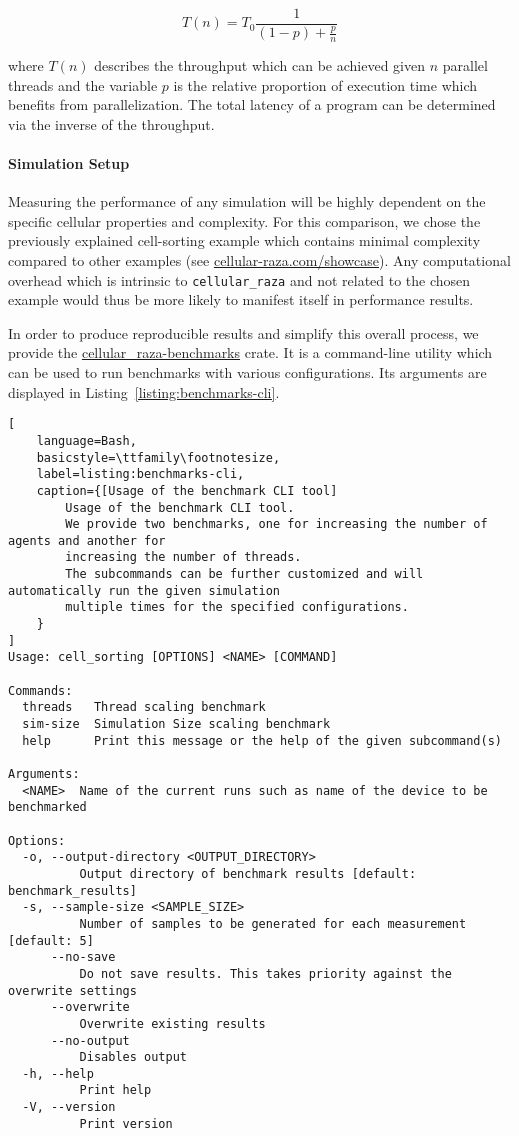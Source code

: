 \documentclass[a4paper]{article}
\begin{document}
\begin{equation}
    T(n) = T_0\frac{1}{(1-p) + \frac{p}{n}}
    \label{eq:amdahls-law}
\end{equation}

where $T(n)$ describes the throughput which can be achieved given $n$ parallel threads and the
variable $p$ is the relative proportion of execution time which benefits from parallelization.
The total latency of a program can be determined via the inverse of the throughput.

\paragraph{Simulation Setup}
Measuring the performance of any simulation will be highly dependent on the specific cellular 
properties and complexity.
For this comparison, we chose the previously explained cell-sorting example which contains minimal
complexity compared to other examples (see
\href{https://cellular-raza.com/showcase}{cellular-raza.com/showcase}).
Any computational overhead which is intrinsic to \texttt{cellular\_raza} and not related to the
chosen example would thus be more likely to manifest itself in performance results.

In order to produce reproducible results and simplify this overall process, we provide the
\href{https://github.com/jonaspleyer/cellular_raza/tree/master/cellular_raza-benchmarks}{cellular\_raza-benchmarks} crate.
It is a command-line utility which can be used to run benchmarks with various configurations.
Its arguments are displayed in Listing~\ref{listing:benchmarks-cli}.

\begin{minipage}{\linewidth}\begin{lstlisting}[
    language=Bash,
    basicstyle=\ttfamily\footnotesize,
    label=listing:benchmarks-cli,
    caption={[Usage of the benchmark CLI tool]
        Usage of the benchmark CLI tool.
        We provide two benchmarks, one for increasing the number of agents and another for
        increasing the number of threads.
        The subcommands can be further customized and will automatically run the given simulation
        multiple times for the specified configurations.
    }
]
Usage: cell_sorting [OPTIONS] <NAME> [COMMAND]

Commands:
  threads   Thread scaling benchmark
  sim-size  Simulation Size scaling benchmark
  help      Print this message or the help of the given subcommand(s)

Arguments:
  <NAME>  Name of the current runs such as name of the device to be benchmarked

Options:
  -o, --output-directory <OUTPUT_DIRECTORY>
          Output directory of benchmark results [default: benchmark_results]
  -s, --sample-size <SAMPLE_SIZE>
          Number of samples to be generated for each measurement [default: 5]
      --no-save
          Do not save results. This takes priority against the overwrite settings
      --overwrite
          Overwrite existing results
      --no-output
          Disables output
  -h, --help
          Print help
  -V, --version
          Print version
\end{lstlisting}\end{minipage}
\end{document}

